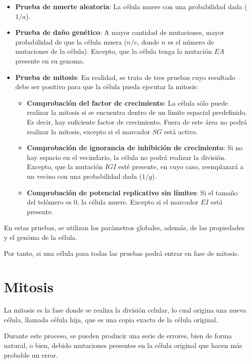 \begin{itemize}
    \item \textbf{Prueba de muerte aleatoria}: La célula muere con una probabilidad dada ($1/a$).
    \item \textbf{Prueba de daño genético}: A mayor cantidad de mutaciones, mayor probabilidad de
    que la célula muera ($n/e$, donde $n$ es el número de mutaciones de la célula). Excepto, que
    la célula tenga la mutación $EA$ presente en su genoma.
    \item \textbf{Prueba de mitosis}: En realidad, se trata de tres pruebas cuyo resultado debe
    ser positivo para que la célula pueda ejecutar la mitosis:
    \begin{itemize}
        \item \textbf{Comprobación del factor de crecimiento}: La célula sólo puede realizar la
        mitosis si se encuentra dentro de un límite espacial predefinido. Es decir, hay suficiente
        factor de crecimiento. Fuera de este área no podrá realizar la mitosis, excepto si el
        marcador $SG$ está activo.
        \item \textbf{Comprobación de ignorancia de inhibición de crecimiento}: Si no hay
        espacio en el vecindario, la célula no podrá realizar la división. Excepto, que
        la mutación $IGI$ esté presente, en cuyo caso, reemplazará a un vecino con una
        probabilidad dada ($1/g$).
        \item \textbf{Comprobación de potencial replicativo sin límites}: Si el tamaño del telómero
        es $0$, la célula muere. Excepto si el marcador $EI$ está presente.
    \end{itemize}
\end{itemize}

En estas pruebas, se utilizan los parámetros globales, además, de las propiedades y el genóma de la célula.

Por tanto, si una célula pasa todas las pruebas podrá entrar en fase de mitosis.

\section{Mitosis}

La mitosis es la fase donde se realiza la división celular, lo cual origina una nueva célula, llamada
célula hija, que es una copia exacta de la célula original.

Durante este proceso, se pueden producir una serie de errores, bien de forma natural, o bien, debido
mutaciones presentes en la célula original que hacen más probable un error.

